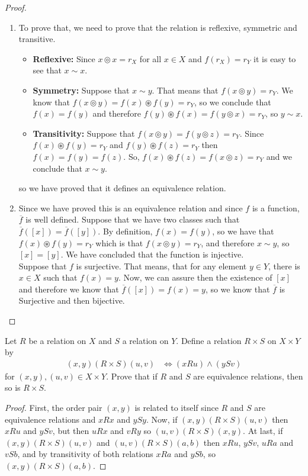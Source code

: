 \documentclass{tufte-handout}
\begin{document}
\begin{proof}
	\begin{enumerate}
		\item To prove that, we need to prove that the relation is reflexive, symmetric and transitive.
		\begin{itemize}
			\item \textbf{Reflexive:} Since $x \circledcirc x = r_X$ for all $x \in X$ and $f(r_X) = r_Y$ it is easy to see that $x \sim x$.
			\item \textbf{Symmetry:} Suppose that $x \sim y$. That means that $f(x \circledcirc y) = r_Y$. We know that $f(x \circledcirc y) = f(x) \circledast f(y) = r_Y$, so we conclude that $f(x) = f(y)$ and therefore $f(y) \circledast f(x) = f(y \circledcirc x) = r_Y$, so $y \sim x$.
			\item \textbf{Transitivity:} Suppose that $f(x \circledcirc y) = f(y \circledcirc z) = r_Y$. Since $f(x) \circledast f(y) = r_Y$ and $f(y) \circledast f(z) = r_Y$ then $f(x) = f(y) = f(z)$. So, $f(x) \circledast f(z) = f(x \circledcirc z) = r_Y$ and we conclude that $x \sim y$. 
		\end{itemize}
		so we have proved that it defines an equivalence relation.
		\item Since we have proved this is an equivalence relation and since $f$ is a function, $\overline{f}$ is well defined. Suppose that we have two classes such that $\overline{f}([x]) = \overline{f}([y])$. By definition, $f(x) = f(y)$, so we have that $f(x) \circledast f(y) = r_Y$ which is that $f(x \circledcirc y) = r_Y$, and therefore $x \sim y$, so $[x] = [y]$. We have concluded that the function is injective.\\
		
		Suppose that $f$ is surjective. That means, that for any element $y \in Y$, there is $x \in X$ such that $f(x) = y$. Now, we can assure then the existence of $[x]$ and therefore we know that $\overline{f}([x]) = f(x) = y$, so we know that $\overline{f}$ is Surjective and then bijective.
	\end{enumerate}
\end{proof}

\begin{problem}
	Let $R$ be a relation on $X$ and $S$ a relation on $Y$. Define a relation $R \times S$ on $X \times Y$ by
	\begin{align*}
		(x, y)(R \times S)(u, v) &\Longleftrightarrow (xRu) \wedge (ySv)
	\end{align*}
	for $(x, y), (u, v) \in X \times Y$. Prove that if $R$ and $S$ are equivalence relations, then so is $R \times S$.
\end{problem}
\begin{proof}
	First, the order pair $(x, y)$ is related to itself since $R$ and $S$ are equivalence relations and $xRx$ and $ySy$. Now, if $(x, y)(R \times S)(u, v)$ then $xRu$ and $ySv$, but then $uRx$ and $vRy$ so $(u, v)(R \times S)(x, y)$. At last, if $(x, y)(R \times S)(u, v)$ and $(u, v)(R \times S)(a, b)$ then $xRu$, $ySv$, $uRa$ and $vSb$, and by transitivity of both relations $xRa$ and $ySb$, so $(x, y)(R \times S)(a, b)$.
\end{proof}
\end{document}
